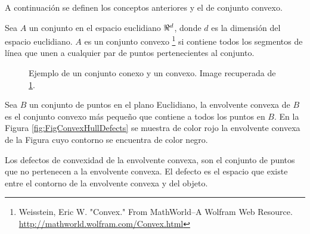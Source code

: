 A continuación se definen los conceptos anteriores y el de conjunto convexo.

Sea $A$ un conjunto en el espacio euclidiano $\bold{\Re}^d$, donde $d$ es la dimensión del espacio euclidiano. $A$ es un conjunto convexo \footnote{\label{ConvexFN} Weisstein, Eric W. "Convex." From MathWorld--A Wolfram Web Resource. \url{http://mathworld.wolfram.com/Convex.html}} si contiene todos los segmentos de línea que unen a cualquier par de puntos pertenecientes al conjunto.  
\begin{figure}[h!]
\centering
{} \hspace{10mm}
 \hspace{10mm}
\caption{Ejemplo de un conjunto conexo y un convexo. Image recuperada de \ref{ConvexFN}. }\label{fig:Sets}
\end{figure} 

Sea $B$ un conjunto de puntos en el plano Euclidiano, la envolvente convexa de $B$ es el conjunto convexo más pequeño que contiene a todos los puntos en $B$. En la Figura \ref{fig:FigConvexHullDefects} se muestra de color rojo la envolvente convexa de la Figura cuyo contorno se encuentra de color negro. 

Los defectos de convexidad de la envolvente convexa, son el conjunto de puntos que no pertenecen a la envolvente convexa. El defecto es el espacio que existe entre el contorno de la envolvente convexa y del objeto.

